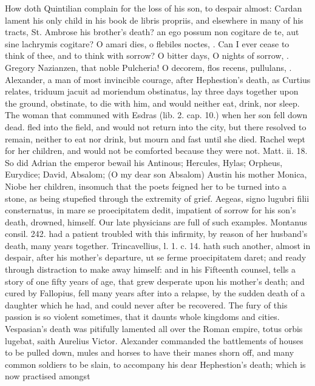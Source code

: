 {How doth Quintilian complain for the loss of his son, to despair
almost: Cardan lament his only child in his book de libris propriis,
and elsewhere in many of his tracts, St. Ambrose his brother's
death? an ego possum non cogitare de te, aut sine lachrymis cogitare? O
amari dies, o flebiles noctes, \etc{}. Can I ever cease to think of thee,
and to think with sorrow? O bitter days, O nights of sorrow, \etc{}.
Gregory Nazianzen, that noble Pulcheria! O decorem, \etc{} flos recens,
pullulans, \etc{}. Alexander, a man of most invincible courage, after
Hephestion's death, as Curtius relates, triduum jacuit ad moriendum
obstinatus, lay three days together upon the ground, obstinate, to die
with him, and would neither eat, drink, nor sleep. The woman that
communed with Esdras (lib. 2. cap. 10.) when her son fell down dead.
fled into the field, and would not return into the city, but there
resolved to remain, neither to eat nor drink, but mourn and fast until
she died. Rachel wept for her children, and would not be comforted
because they were not. Matt. ii. 18. So did Adrian the emperor bewail
his Antinous; Hercules, Hylas; Orpheus, Eurydice; David, Absalom; (O my
dear son Absalom) Austin his mother Monica, Niobe her children,
insomuch that the poets feigned her to be turned into a stone, as
being stupefied through the extremity of grief. Aegeas, signo
lugubri filii consternatus, in mare se proecipitatem dedit, impatient
of sorrow for his son's death, drowned, himself. Our late physicians
are full of such examples. Montanus consil. 242. had a patient
troubled with this infirmity, by reason of her husband's death, many
years together. Trincavellius, l. 1. c. 14. hath such another, almost
in despair, after his mother's departure, ut se ferme
proecipitatem daret; and ready through distraction to make away
himself: and in his Fifteenth counsel, tells a story of one fifty years
of age, that grew desperate upon his mother's death; and cured by
Fallopius, fell many years after into a relapse, by the sudden death of
a daughter which he had, and could never after be recovered. The fury
of this passion is so violent sometimes, that it daunts whole kingdoms
and cities. Vespasian's death was pitifully lamented all over the Roman
empire, totus orbis lugebat, saith Aurelius Victor. Alexander commanded
the battlements of houses to be pulled down, mules and horses to have
their manes shorn off, and many common soldiers to be slain, to
accompany his dear Hephestion's death; which is now practised amongst
}
